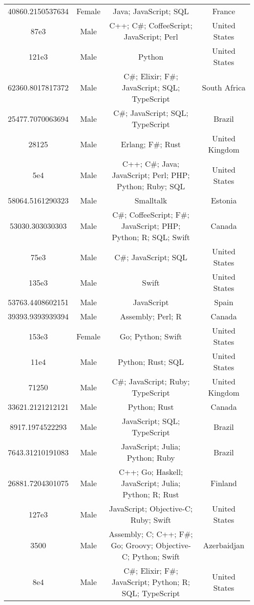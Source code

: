 \begin{center}
\begin{tabular}{ |c|c|c|c| }
40860.2150537634  &  Female  &  Java; JavaScript; SQL  &  France  \\ 
87e3  &  Male  &  C++; C\#; CoffeeScript; JavaScript; Perl  &  United States  \\ 
121e3  &  Male  &  Python  &  United States  \\ 
62360.8017817372  &  Male  &  C\#; Elixir; F\#; JavaScript; SQL; TypeScript  &  South Africa  \\ 
25477.7070063694  &  Male  &  C\#; JavaScript; SQL; TypeScript  &  Brazil  \\ 
28125  &  Male  &  Erlang; F\#; Rust  &  United Kingdom  \\ 
5e4  &  Male  &  C++; C\#; Java; JavaScript; Perl; PHP; Python; Ruby; SQL  &  United States  \\ 
58064.5161290323  &  Male  &  Smalltalk  &  Estonia  \\ 
53030.303030303  &  Male  &  C\#; CoffeeScript; F\#; JavaScript; PHP; Python; R; SQL; Swift  &  Canada  \\ 
75e3  &  Male  &  C\#; JavaScript; SQL  &  United States  \\ 
135e3  &  Male  &  Swift  &  United States  \\ 
53763.4408602151  &  Male  &  JavaScript  &  Spain  \\ 
39393.9393939394  &  Male  &  Assembly; Perl; R  &  Canada  \\ 
153e3  &  Female  &  Go; Python; Swift  &  United States  \\ 
11e4  &  Male  &  Python; Rust; SQL  &  United States  \\ 
71250  &  Male  &  C\#; JavaScript; Ruby; TypeScript  &  United Kingdom  \\ 
33621.2121212121  &  Male  &  Python; Rust  &  Canada  \\ 
8917.1974522293  &  Male  &  JavaScript; SQL; TypeScript  &  Brazil  \\ 
7643.31210191083  &  Male  &  JavaScript; Julia; Python; Ruby  &  Brazil  \\ 
26881.7204301075  &  Male  &  C++; Go; Haskell; JavaScript; Julia; Python; R; Rust  &  Finland  \\ 
127e3  &  Male  &  JavaScript; Objective-C; Ruby; Swift  &  United States  \\ 
3500  &  Male  &  Assembly; C; C++; F\#; Go; Groovy; Objective-C; Python; Swift  &  Azerbaidjan  \\ 
8e4  &  Male  &  C\#; Elixir; F\#; JavaScript; Python; R; SQL; TypeScript  &  United States  \\ 

\end{tabular}
\end{center}
